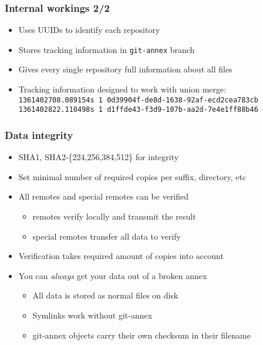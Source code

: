 \documentclass[t]{beamer}
\begin{document}
\begin{frame}
	\frametitle{Internal workings 2/2}
	\begin{itemize}
		\item Uses UUIDs to identify each repository
		\item Stores tracking information in \texttt{git-annex} branch
		\item Gives every single repository full information about all files
		\item Tracking information designed to work with union merge: \\
			{\footnotesize \texttt{1361402708.089154s 1 0d39904f-de8d-1638-92af-ecd2cea783cb}} \\
			{\footnotesize \texttt{1361402822.110498s 1 d1ffde43-f3d9-107b-aa2d-7e4e1ff88b46}}
	\end{itemize}
\end{frame}

\begin{frame}
	\frametitle{Data integrity}
	\begin{itemize}
		\item SHA1, SHA2-\{224,256,384,512\} for integrity
		\item Set minimal number of required copies per suffix, directory, etc
		\item All remotes and special remotes can be verified
		\begin{itemize}
			\item remotes verify locally and transmit the result
			\item special remotes transfer all data to verify
		\end{itemize}
		\item Verification takes required amount of copies into account
		\item You can \textit{always} get your data out of a broken annex
		\begin{itemize}
			\item All data is stored as normal files on disk
			\item Symlinks work without git-annex
			\item git-annex objects carry their own checksum in their filename
		\end{itemize}
	\end{itemize}
\end{frame}
\end{document}
